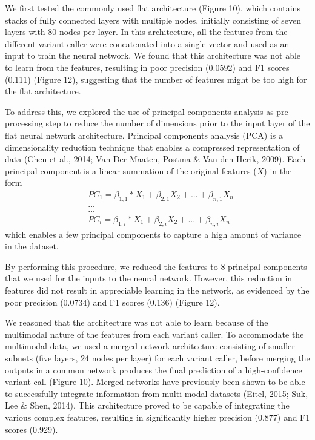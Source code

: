 \documentclass{article}
\begin{document}
We first tested the commonly used flat architecture (Figure 10), which contains stacks of fully connected layers with multiple nodes, initially consisting of seven layers with 80 nodes per layer. In this architecture, all the features from the different variant caller were concatenated into a single vector and used as an input to train the neural network. We found that this architecture was not able to learn from the features, resulting in poor precision (0.0592) and F1 scores (0.111) (Figure 12), suggesting that the number of features might be too high for the flat architecture. 

To address this, we explored the use of principal components analysis as pre-processing step to reduce the number of dimensions prior to the input layer of the flat neural network architecture. Principal components analysis (PCA) is a dimensionality reduction technique that enables a compressed representation of data (Chen et al., 2014; Van Der Maaten, Postma \& Van den Herik, 2009). Each principal component is a linear summation of the original features ($X$) in the form 
\begin{align*}
&PC_1 = \beta_{1,1}*X_{1} + \beta_{2,1} X_{2} +... + \beta_{n,1} X_n \\
&... \\
&... \\
&PC_i = \beta_{1,i}*X_{1} + \beta_{2,i} X_{2} +... + \beta_{n,i} X_n
\end{align*}
which enables a few principal components to capture a high amount of variance in the dataset.

By performing this procedure, we reduced the features to 8 principal components that we used for the inputs to the neural network. However, this reduction in features did not result in appreciable learning in the network, as evidenced by the poor precision (0.0734) and F1 scores (0.136) (Figure 12).

We reasoned that the architecture was not able to learn because of the multimodal nature of the features from each variant caller. To accommodate the multimodal data, we used a merged network architecture consisting of smaller subnets (five layers, 24 nodes per layer) for each variant caller, before merging the outputs in a common network produces the final prediction of a high-confidence variant call (Figure 10). Merged networks have previously been shown to be able to successfully integrate information from multi-modal datasets (Eitel, 2015; Suk, Lee \& Shen, 2014). This architecture proved to be capable of integrating the various complex features, resulting in significantly higher precision (0.877) and F1 scores (0.929). 
\end{document}
